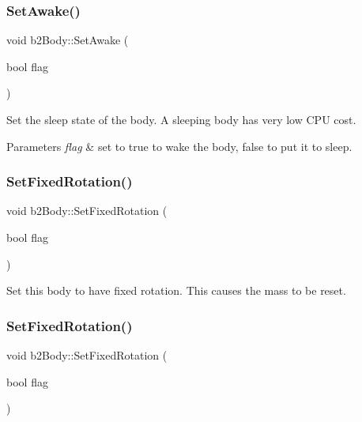 \subsubsection{\texorpdfstring{Set\+Awake()}{SetAwake()}\hspace{0.1cm}{\footnotesize\ttfamily [2/2]}}
{\footnotesize\ttfamily void b2\+Body\+::\+Set\+Awake (\begin{DoxyParamCaption}\item[{bool}]{flag }\end{DoxyParamCaption})}

Set the sleep state of the body. A sleeping body has very low C\+PU cost. 
\begin{DoxyParams}{Parameters}
{\em flag} & set to true to wake the body, false to put it to sleep. \\
\hline
\end{DoxyParams}
\mbox{\label{classb2Body_aff35078e2a221d2d05409674936cb8d2}} 
\subsubsection{\texorpdfstring{Set\+Fixed\+Rotation()}{SetFixedRotation()}\hspace{0.1cm}{\footnotesize\ttfamily [1/2]}}
{\footnotesize\ttfamily void b2\+Body\+::\+Set\+Fixed\+Rotation (\begin{DoxyParamCaption}\item[{bool}]{flag }\end{DoxyParamCaption})}

Set this body to have fixed rotation. This causes the mass to be reset. \mbox{\label{classb2Body_aff35078e2a221d2d05409674936cb8d2}} 
\subsubsection{\texorpdfstring{Set\+Fixed\+Rotation()}{SetFixedRotation()}\hspace{0.1cm}{\footnotesize\ttfamily [2/2]}}
{\footnotesize\ttfamily void b2\+Body\+::\+Set\+Fixed\+Rotation (\begin{DoxyParamCaption}\item[{bool}]{flag }\end{DoxyParamCaption})}

